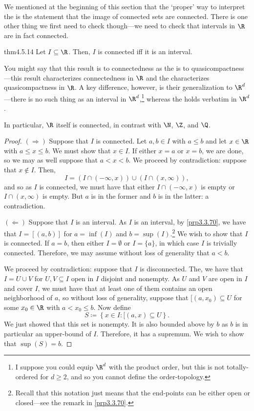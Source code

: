 We mentioned at the beginning of this section that the `proper' way to interpret the  is the statement that the image of connected sets are connected.  There is one other thing we first need to check though---we need to check that intervals in $\R$ are in fact connected.
\begin{thm}{}{thm4.5.14}
Let $I\subseteq \R$.  Then, $I$ is connected iff it is an interval.
\begin{rmk}
You might say that this result is to connectedness as the  is to quasicompactness---this result characterizes connectedness in $\R$ and the  characterizes quasicompactness in $\R$.  A key difference, however, is their generalization to $\R ^d$---there is no such thing as an interval in $\R ^d$,\footnote{I suppose you could equip $\R ^d$ with the product order, but this is not totally-ordered for $d\geq 2$, and so you cannot define the order-topology.} whereas the  holds verbatim in $\R ^d$.
\end{rmk}
\begin{rmk}
In particular, $\R$ itself is connected, in contrast with $\N$, $\Z$, and $\Q$.
\end{rmk}
\begin{proof}
$(\Rightarrow )$ Suppose that $I$ is connected.  Let $a,b\in I$ with $a\leq b$ and let $x\in \R$ with $a\leq x\leq b$.  We must show that $x\in I$.  If either $x=a$ or $x=b$, we are done, so we may as well suppose that $a<x<b$.  We proceed by contradiction:  suppose that $x\notin I$.  Then,
\begin{equation}
I=(I\cap (-\infty ,x))\cup (I\cap (x,\infty )),
\end{equation}
and so as $I$ is connected, we must have that either $I\cap (-\infty ,x)$ is empty or $I\cap (x,\infty )$ is empty.  But $a$ is in the former and $b$ is in the latter:  a contradiction.

\blankline
\noindent
$(\Leftarrow )$ Suppose that $I$ is an interval.  As $I$ is an interval, by \cref{prp3.3.70}, we have that $I=[(a,b)]$ for $a=\inf (I)$ and $b=\sup (I)$.\footnote{Recall that this notation just means that the end-points can be either open or closed---see the remark in \cref{prp3.3.70}.}  We wish to show that $I$ is connected.  If $a=b$, then either $I=\emptyset$ or $I=\{ a\}$, in which case $I$ is trivially connected.  Therefore, we may assume without loss of generality that $a<b$.

We proceed by contradiction:  suppose that $I$ is disconnected.  The, we have that $I=U\cup V$ for $U,V\subseteq I$ open in $I$ disjoint and nonempty.  As $U$ and $V$ are open in $I$ and cover $I$, we must have that at least one of them contains an open neighborhood of $a$, so without loss of generality, suppose that $[(a,x_0)\subseteq U$ for some $x_0\in \R$ with $a<x_0\leq b$.  Now define
\begin{equation}
S\coloneqq \left\{ x\in I :[(a,x)\subseteq U\right\} .
\end{equation}
We just showed that this set is nonempty.  It is also bounded above by $b$ as $b$ is in particular an upper-bound of $I$.  Therefore, it has a supremum.  We wish to show that $\sup (S)=b$.


\end{proof}
\end{thm}
